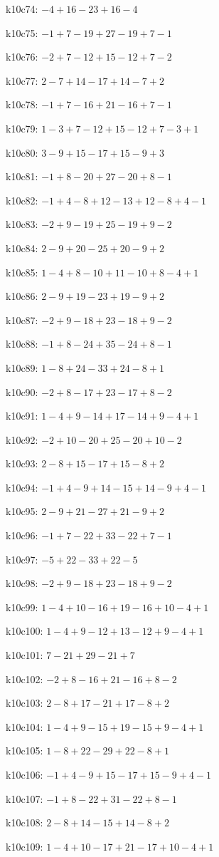 k10c74: $ -4+16-23+16-4 $ 

k10c75: $ -1+7-19+27-19+7-1 $ 

k10c76: $ -2+7-12+15-12+7-2 $ 

k10c77: $ 2-7+14-17+14-7+2 $ 

k10c78: $ -1+7-16+21-16+7-1 $ 

k10c79: $ 1-3+7-12+15-12+7-3+1 $ 

k10c80: $ 3-9+15-17+15-9+3 $ 

k10c81: $ -1+8-20+27-20+8-1 $ 

k10c82: $ -1+4-8+12-13+12-8+4-1 $ 

k10c83: $ -2+9-19+25-19+9-2 $ 

k10c84: $ 2-9+20-25+20-9+2 $ 

k10c85: $ 1-4+8-10+11-10+8-4+1 $ 

k10c86: $ 2-9+19-23+19-9+2 $ 

k10c87: $ -2+9-18+23-18+9-2 $ 

k10c88: $ -1+8-24+35-24+8-1 $ 

k10c89: $ 1-8+24-33+24-8+1 $ 

k10c90: $ -2+8-17+23-17+8-2 $ 

k10c91: $ 1-4+9-14+17-14+9-4+1 $ 

k10c92: $ -2+10-20+25-20+10-2 $ 

k10c93: $ 2-8+15-17+15-8+2 $ 

k10c94: $ -1+4-9+14-15+14-9+4-1 $ 

k10c95: $ 2-9+21-27+21-9+2 $ 

k10c96: $ -1+7-22+33-22+7-1 $ 

k10c97: $ -5+22-33+22-5 $ 

k10c98: $ -2+9-18+23-18+9-2 $ 

k10c99: $ 1-4+10-16+19-16+10-4+1 $ 

k10c100: $ 1-4+9-12+13-12+9-4+1 $ 

k10c101: $ 7-21+29-21+7 $ 

k10c102: $ -2+8-16+21-16+8-2 $ 

k10c103: $ 2-8+17-21+17-8+2 $ 

k10c104: $ 1-4+9-15+19-15+9-4+1 $ 

k10c105: $ 1-8+22-29+22-8+1 $ 

k10c106: $ -1+4-9+15-17+15-9+4-1 $ 

k10c107: $ -1+8-22+31-22+8-1 $ 

k10c108: $ 2-8+14-15+14-8+2 $ 

k10c109: $ 1-4+10-17+21-17+10-4+1 $ 

